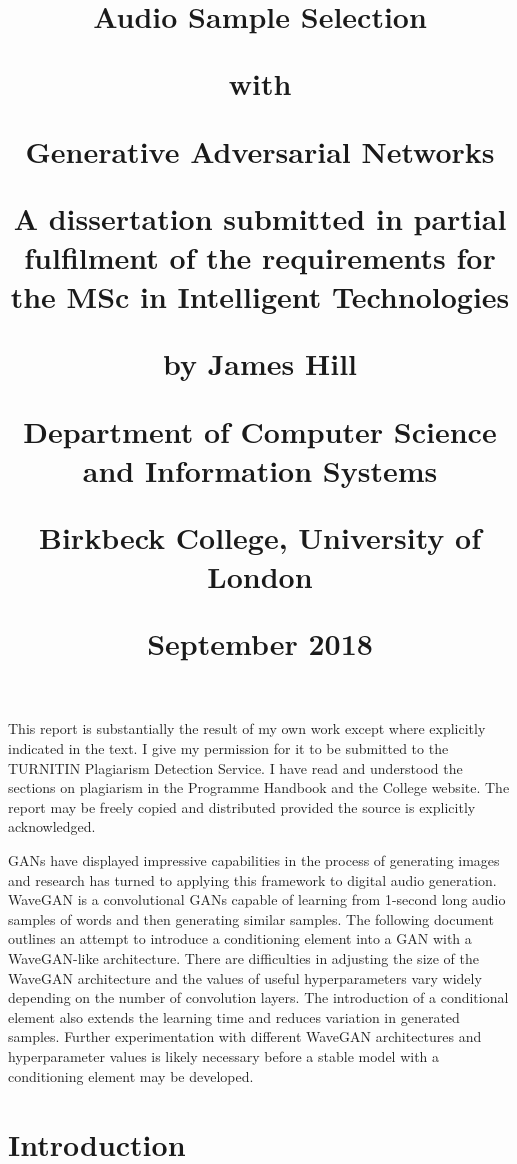 \documentclass[a4paper, titlepage]{article}
\title{
  \begin{center}Audio Sample Selection\end{center}
  \begin{center}with\end{center}
  \begin{center}Generative Adversarial Networks\end{center}
  \begin{center}\end{center}
  \begin{center}A dissertation submitted in partial fulfilment of the requirements for the MSc in Intelligent Technologies\end{center}
  \begin{center}\end{center}
  \begin{center}by James Hill\end{center}
  \begin{center}\end{center}
  \begin{center}Department of Computer Science and Information Systems\end{center}
  \begin{center}Birkbeck College, University of London\end{center}
  \begin{center}\end{center}
  \begin{center}September 2018\end{center}
  }
\author{}
\date{}
\renewenvironment{abstract}
{
  \small
  \begin{center}
    \bfseries \abstractname\vspace{-.5em}\vspace{0pt}
  \end{center}
  \list{}{
    \setlength{\leftmargin}{2cm}
    \setlength{\rightmargin}{\leftmargin}
  }
\item\relax
}{\endlist}
\begin{document}
\maketitle

\newpage


\noindent
This report is substantially the result of my own work except where explicitly indicated in the text.
I give my permission for it to be submitted to the TURNITIN Plagiarism Detection Service.
I have read and understood the sections on plagiarism in the Programme Handbook and the College website.
\newline
\newline
\noindent
The report may be freely copied and distributed provided the source is explicitly acknowledged.

\newpage

\begin{abstract}
  \ac{GAN}s have displayed impressive capabilities in the process of generating images and research has turned to applying this framework to digital audio generation.
  WaveGAN is a convolutional GANs capable of learning from 1-second long audio samples of words and then generating similar samples.
  The following document outlines an attempt to introduce a conditioning element into a GAN with a WaveGAN-like architecture.
  There are difficulties in adjusting the size of the WaveGAN architecture and the values of useful hyperparameters vary widely depending on the number of convolution layers.
  The introduction of a conditional element also extends the learning time and reduces variation in generated samples.
  Further experimentation with different WaveGAN architectures and hyperparameter values is likely necessary before a stable model with a conditioning element may be developed.
\end{abstract}

\newpage

\tableofcontents

\newpage

\listoffigures
\listoftables

\newpage

\printacronyms[include-classes=abbrev, name=Acronyms]

\newpage

\setcounter{page}{1}

\section{Introduction}
\end{document}
